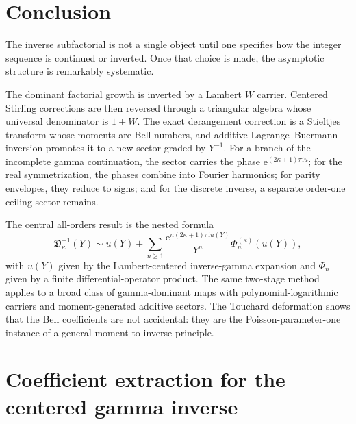\documentclass[11pt]{article}
\numberwithin{equation}{section}
\theoremstyle{mainthm}
\theoremstyle{defstyle}
\theoremstyle{remark}
\newcommand{\e}{\mathrm e}
\newcommand{\ii}{\mathrm i}
\newcommand{\Dsub}{\mathfrak D}
\begin{document}
\section{Conclusion}

The inverse subfactorial is not a single object until one specifies how the integer sequence is continued or inverted.  Once that choice is made, the asymptotic structure is remarkably systematic.

The dominant factorial growth is inverted by a Lambert \(W\) carrier.  Centered Stirling corrections are then reversed through a triangular algebra whose universal denominator is \(1+W\).  The exact derangement correction is a Stieltjes transform whose moments are Bell numbers, and additive Lagrange--Buermann inversion promotes it to a new sector graded by \(Y^{-1}\).  For a branch of the incomplete gamma continuation, the sector carries the phase \(\e^{(2\kappa+1)\pi\ii u}\); for the real symmetrization, the phases combine into Fourier harmonics; for parity envelopes, they reduce to signs; and for the discrete inverse, a separate order-one ceiling sector remains.

The central all-orders result is the nested formula
\[
 \Dsub_\kappa^{-1}(Y)
 \sim u(Y)+\sum_{n\ge1}\frac{\e^{n(2\kappa+1)\pi\ii u(Y)}}{Y^n}
 \Phi_n^{(\kappa)}(u(Y)),
\]
with \(u(Y)\) given by the Lambert-centered inverse-gamma expansion and \(\Phi_n\) given by a finite differential-operator product.  The same two-stage method applies to a broad class of gamma-dominant maps with polynomial-logarithmic carriers and moment-generated additive sectors.  The Touchard deformation shows that the Bell coefficients are not accidental: they are the Poisson-parameter-one instance of a general moment-to-inverse principle.

\appendix

\section{Coefficient extraction for the centered gamma inverse}\label{app:gamma-coefficients}
\end{document}
